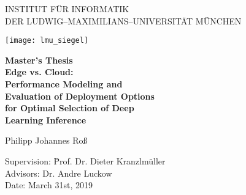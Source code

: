 \begin{center}

\vspace*{-2cm}

{\Huge INSTITUT FÜR INFORMATIK\\[1mm]}
DER LUDWIG--MAXIMILIANS--UNIVERSITÄT MÜNCHEN\\

\vspace*{1cm}

\texttt{[image: lmu\_siegel]}

\vspace*{2cm}

{\Large \textbf{Master's Thesis}}\\ %

\vspace{2.0cm}
{\Huge \textbf{Edge vs. Cloud:}}\\
\vspace*{2.0mm}
{\Huge \textbf{Performance Modeling and}}\\
\vspace*{2.0mm}
{\Huge \textbf{Evaluation of Deployment Options}}\\
 \vspace*{2.0mm}
{\Huge \textbf{for Optimal Selection of Deep}}\\
 \vspace*{2.0mm}
{\Huge \textbf{Learning Inference}}\\
\vspace{1.0cm}

{\LARGE Philipp Johannes Roß} %
\vspace{2cm}

\parbox{1cm}{
\begin{large}
\begin{tabbing}
Supervision: \hspace{.5cm} \=Prof. Dr. Dieter Kranzlmüller\\[2mm]
Advisors:
\>Dr. Andre Luckow\\[2mm]
Date: \> March 31st, 2019\\
\end{tabbing}
\end{large}}\\
\vspace{5mm}

\end{center}
